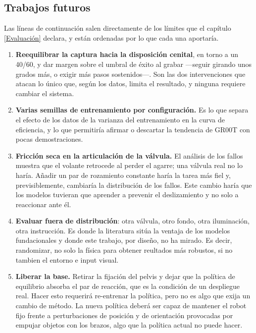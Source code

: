 \subsection*{Trabajos futuros}

Las líneas de continuación salen directamente de los límites que el capítulo \ref{Evaluación}
declara, y están ordenadas por lo que cada una aportaría.

\begin{enumerate}

	\item \textbf{Reequilibrar la captura hacia la disposición cenital}, en torno a un 40/60, y
	dar margen sobre el umbral de éxito al grabar —seguir girando unos grados más, o exigir más
	pasos sostenidos—. Son las dos intervenciones que atacan lo único que, según los datos, limita
	el resultado, y ninguna requiere cambiar el sistema.

	\item \textbf{Varias semillas de entrenamiento por configuración.} Es lo que separa el efecto
	de los datos de la varianza del entrenamiento en la curva de eficiencia, y lo que permitiría
	afirmar o descartar la tendencia de GR00T con pocas demostraciones.

	\item \textbf{Fricción seca en la articulación de la válvula.} El análisis de los fallos
	muestra que el volante retrocede al perder el agarre; una válvula real no lo haría. Añadir un
	par de rozamiento constante haría la tarea más fiel y, previsiblemente, cambiaría la
	distribución de los fallos. Este cambio haría que los modelos tuvieran que aprender a
	prevenir el deslizamiento y no solo a reaccionar ante él.

	\item \textbf{Evaluar fuera de distribución}: otra válvula, otro fondo, otra iluminación,
	otra instrucción. Es donde la literatura sitúa la ventaja de los modelos fundacionales y donde
	este trabajo, por diseño, no ha mirado. Es decir, randomizar, no solo la física para obtener
	reultados más robustos, si no tambien el entorno e input visual.

	\item \textbf{Liberar la base.} Retirar la fijación del pelvis y dejar que la política de
	equilibrio absorba el par de reacción, que es la condición de un despliegue real. Hacer esto
	requerirá re-entrenar la política, pero no es algo que exija un cambio de método. La nueva
	política deberá ser capaz de mantener el robot fijo frente a perturbaciones de posición y
	de orientación provocadas por empujar objetos con los brazos, algo que la política actual no puede hacer.


\end{enumerate}
